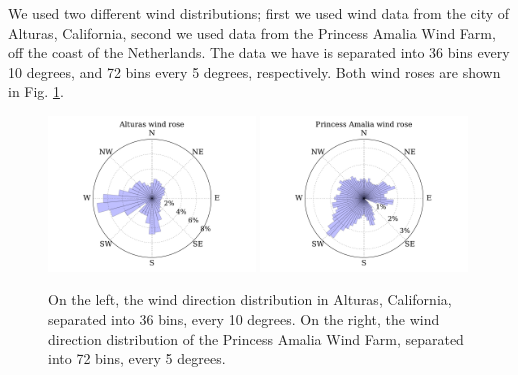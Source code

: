 We used two different wind distributions; first we used wind data from the city of Alturas, California, second we used data from the Princess Amalia Wind Farm, off the coast of the Netherlands. 
The data we have is separated into 36 bins every 10 degrees, and 72 bins every 5 degrees, respectively. Both wind roses are shown in Fig. \ref{wind_roses}.

\begin{figure}[htbp]
  \centering
  \includegraphics[width=0.49\textwidth]{Figures/alturas_rose.pdf}
  \includegraphics[width=0.49\textwidth]{Figures/amalia_rose.pdf}
  \caption{\label{wind_roses} On the left, the wind direction distribution in Alturas, California, separated into 36 bins, every 10 degrees. On the right, the wind direction distribution of the Princess Amalia Wind Farm, separated into 72 bins, every 5 degrees.}
\end{figure}


